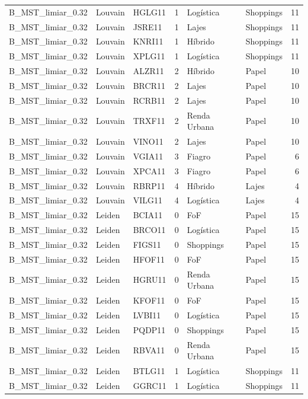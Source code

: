 \begin{tabular}{lllrllr}
B\_MST\_limiar\_0.32 & Louvain & HGLG11 & 1 & Logística & Shoppings & 11 \\
B\_MST\_limiar\_0.32 & Louvain & JSRE11 & 1 & Lajes & Shoppings & 11 \\
B\_MST\_limiar\_0.32 & Louvain & KNRI11 & 1 & Híbrido & Shoppings & 11 \\
B\_MST\_limiar\_0.32 & Louvain & XPLG11 & 1 & Logística & Shoppings & 11 \\
B\_MST\_limiar\_0.32 & Louvain & ALZR11 & 2 & Híbrido & Papel & 10 \\
B\_MST\_limiar\_0.32 & Louvain & BRCR11 & 2 & Lajes & Papel & 10 \\
B\_MST\_limiar\_0.32 & Louvain & RCRB11 & 2 & Lajes & Papel & 10 \\
B\_MST\_limiar\_0.32 & Louvain & TRXF11 & 2 & Renda Urbana & Papel & 10 \\
B\_MST\_limiar\_0.32 & Louvain & VINO11 & 2 & Lajes & Papel & 10 \\
B\_MST\_limiar\_0.32 & Louvain & VGIA11 & 3 & Fiagro & Papel & 6 \\
B\_MST\_limiar\_0.32 & Louvain & XPCA11 & 3 & Fiagro & Papel & 6 \\
B\_MST\_limiar\_0.32 & Louvain & RBRP11 & 4 & Híbrido & Lajes & 4 \\
B\_MST\_limiar\_0.32 & Louvain & VILG11 & 4 & Logística & Lajes & 4 \\
B\_MST\_limiar\_0.32 & Leiden & BCIA11 & 0 & FoF & Papel & 15 \\
B\_MST\_limiar\_0.32 & Leiden & BRCO11 & 0 & Logística & Papel & 15 \\
B\_MST\_limiar\_0.32 & Leiden & FIGS11 & 0 & Shoppings & Papel & 15 \\
B\_MST\_limiar\_0.32 & Leiden & HFOF11 & 0 & FoF & Papel & 15 \\
B\_MST\_limiar\_0.32 & Leiden & HGRU11 & 0 & Renda Urbana & Papel & 15 \\
B\_MST\_limiar\_0.32 & Leiden & KFOF11 & 0 & FoF & Papel & 15 \\
B\_MST\_limiar\_0.32 & Leiden & LVBI11 & 0 & Logística & Papel & 15 \\
B\_MST\_limiar\_0.32 & Leiden & PQDP11 & 0 & Shoppings & Papel & 15 \\
B\_MST\_limiar\_0.32 & Leiden & RBVA11 & 0 & Renda Urbana & Papel & 15 \\
B\_MST\_limiar\_0.32 & Leiden & BTLG11 & 1 & Logística & Shoppings & 11 \\
B\_MST\_limiar\_0.32 & Leiden & GGRC11 & 1 & Logística & Shoppings & 11 \\

\end{tabular}
